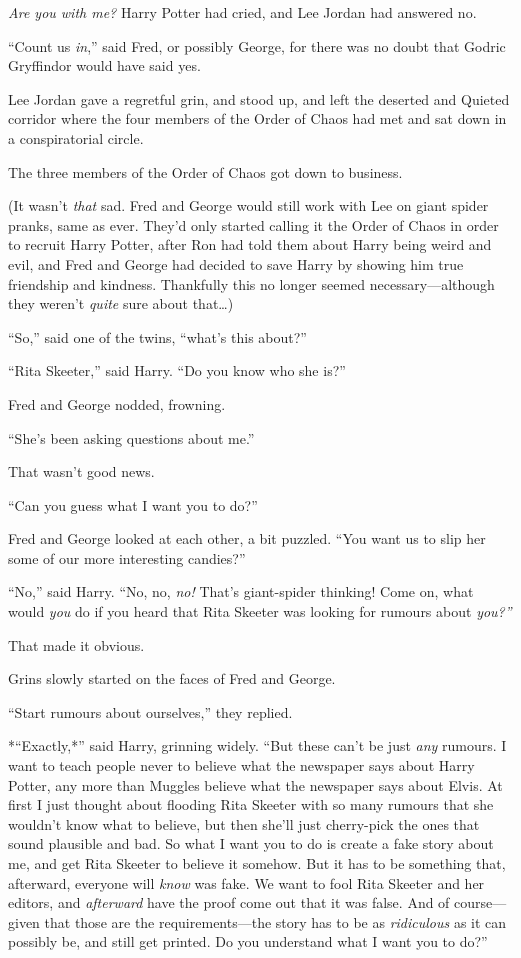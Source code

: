 \emph{Are you with me?} Harry Potter had cried, and Lee Jordan had
answered no.

``Count us \emph{in},'' said Fred, or possibly George, for there was no
doubt that Godric Gryffindor would have said yes.

Lee Jordan gave a regretful grin, and stood up, and left the deserted
and Quieted corridor where the four members of the Order of Chaos had
met and sat down in a conspiratorial circle.

The three members of the Order of Chaos got down to business.

(It wasn't \emph{that} sad. Fred and George would still work with Lee on
giant spider pranks, same as ever. They'd only started calling it the
Order of Chaos in order to recruit Harry Potter, after Ron had told them
about Harry being weird and evil, and Fred and George had decided to
save Harry by showing him true friendship and kindness. Thankfully this
no longer seemed necessary---although they weren't \emph{quite} sure
about that\ldots{})

``So,'' said one of the twins, ``what's this about?''

``Rita Skeeter,'' said Harry. ``Do you know who she is?''

Fred and George nodded, frowning.

``She's been asking questions about me.''

That wasn't good news.

``Can you guess what I want you to do?''

Fred and George looked at each other, a bit puzzled. ``You want us to
slip her some of our more interesting candies?''

``No,'' said Harry. ``No, no, \emph{no!} That's giant-spider thinking!
Come on, what would \emph{you} do if you heard that Rita Skeeter was
looking for rumours about \emph{you?''}

That made it obvious.

Grins slowly started on the faces of Fred and George.

``Start rumours about ourselves,'' they replied.

*``Exactly,*'' said Harry, grinning widely. ``But these can't be just
\emph{any} rumours. I want to teach people never to believe what the
newspaper says about Harry Potter, any more than Muggles believe what
the newspaper says about Elvis. At first I just thought about flooding
Rita Skeeter with so many rumours that she wouldn't know what to
believe, but then she'll just cherry-pick the ones that sound plausible
and bad. So what I want you to do is create a fake story about me, and
get Rita Skeeter to believe it somehow. But it has to be something that,
afterward, everyone will \emph{know} was fake. We want to fool Rita
Skeeter and her editors, and \emph{afterward} have the proof come out
that it was false. And of course---given that those are the
requirements---the story has to be as \emph{ridiculous} as it can
possibly be, and still get printed. Do you understand what I want you to
do?''


